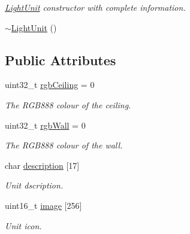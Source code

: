 \begin{DoxyCompactItemize}
\begin{DoxyCompactList}\small\item\em \mbox{\hyperlink{classLightUnit}{Light\+Unit}} constructor with complete information. \end{DoxyCompactList}\item 
\mbox{\hyperlink{classLightUnit_a29969943be7a664ffc0795ec07cc12c2}{$\sim$\+Light\+Unit}} ()
\end{DoxyCompactItemize}
\subsection*{Public Attributes}
\begin{DoxyCompactItemize}
\item 
\mbox{\label{classLightUnit_ae688f610193b69a2f390bd2a44dc2a7c}} 
uint32\+\_\+t \mbox{\hyperlink{classLightUnit_ae688f610193b69a2f390bd2a44dc2a7c}{rgb\+Ceiling}} = 0
\begin{DoxyCompactList}\small\item\em The R\+G\+B888 colour of the ceiling. \end{DoxyCompactList}\item 
\mbox{\label{classLightUnit_a9927e4bcf968e043883688e87935fb4a}} 
uint32\+\_\+t \mbox{\hyperlink{classLightUnit_a9927e4bcf968e043883688e87935fb4a}{rgb\+Wall}} = 0
\begin{DoxyCompactList}\small\item\em The R\+G\+B888 colour of the wall. \end{DoxyCompactList}\item 
\mbox{\label{classLightUnit_aad36ad5ba65b93a30ee35ef1f6895b5a}} 
char \mbox{\hyperlink{classLightUnit_aad36ad5ba65b93a30ee35ef1f6895b5a}{description}} \mbox{[}17\mbox{]}
\begin{DoxyCompactList}\small\item\em Unit dscription. \end{DoxyCompactList}\item 
\mbox{\label{classLightUnit_a01f65fda0c55ecd8b1d62911cfa688d2}} 
uint16\+\_\+t \mbox{\hyperlink{classLightUnit_a01f65fda0c55ecd8b1d62911cfa688d2}{image}} \mbox{[}256\mbox{]}
\begin{DoxyCompactList}\small\item\em Unit icon. \end{DoxyCompactList}\item 

\end{DoxyCompactItemize}
